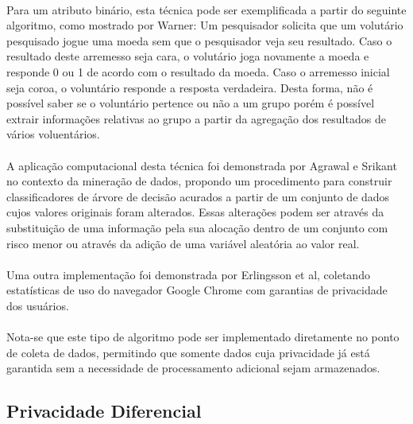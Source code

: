 \paragraph{} Para um atributo binário, esta técnica pode ser exemplificada a partir do seguinte algoritmo, como mostrado por Warner: Um pesquisador solicita que um volutário pesquisado jogue uma moeda sem que o pesquisador veja seu resultado. Caso o resultado deste arremesso seja cara, o volutário joga novamente a moeda e responde 0 ou 1 de acordo com o resultado da moeda. Caso o arremesso inicial seja coroa, o voluntário responde a resposta verdadeira.  Desta forma, não é possível saber se o voluntário pertence ou não a um grupo porém é possível extrair informações relativas ao grupo a partir da agregação dos resultados de vários voluentários.

\paragraph{} A aplicação computacional desta técnica foi demonstrada por Agrawal e Srikant\cite{agrawal2000privacy} no contexto da mineração de dados, propondo um procedimento para construir classificadores de árvore de decisão acurados a partir de um conjunto de dados cujos valores originais foram alterados. Essas alterações podem ser através da substituição de uma informação pela sua alocação dentro de um conjunto com risco menor ou através da adição de uma variável aleatória ao valor real.

\paragraph{} Uma outra implementação foi demonstrada por Erlingsson et al\cite{erlingsson2014rappor}, coletando estatísticas de uso do navegador Google Chrome com garantias de privacidade dos usuários.

\paragraph{} Nota-se que este tipo de algoritmo pode ser implementado diretamente no ponto de coleta de dados, permitindo que somente dados cuja privacidade já está garantida sem a necessidade de processamento adicional sejam armazenados.

\subsection{Privacidade Diferencial}

